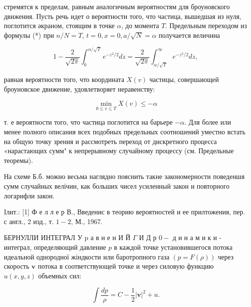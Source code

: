 \documentclass[10pt]{article}
\begin{document}
стремятся к пределам, равным аналогичным вероятностям для броуновского движения. Пусть речь идет о вероятности того, что частица, вышедшая из нуля, поглотится әкраном, стоящим в точке $\alpha$, до момента $T$. Предельным переходом из формулы (*) при $n / N=T$, $t=0, x=0, a / \sqrt{N}=\alpha$ получается величина



\[

1-\frac{2}{\sqrt{2 \pi}} \int_{0}^{\alpha / \sqrt{T}} e^{-z^{2} / 2} d z=\frac{2}{\sqrt{2 \pi}} \int_{\alpha / \sqrt{T}}^{\infty} e^{-z^{2} / 2} d z,

\]



равная вероятности того, что координата $X(v)$ частицы, совершающей броуновское движение, удовлетворяет неравенству:



\[

\min _{0 \leqslant v \leqslant T} X(v) \leqslant-\alpha

\]



т. е вероятности того, что частица поглотится на барьере $-\alpha$. Для более или менее полного описания всех подобных предельных соотношений уместно встать на общую точку зрения и рассмотреть переход от дискретного процесса «нарастающих сумм" к непрерывному случайному процессу (см. Предельные теоремы).



На схеме Б.б. можно весьма наглядно пояснить такне закономерности поведеншя сумм случайных велічин, как больших чисел усиленный закон и повторного логарифли закон.



Iлит.: [1] Ф е л л е р В., Введенис в теорию вероятностей и ее прилтожения, пер. с англ., 2 изд., т. $1-2$, М., 1967.



БЕРНУЛЛИ ИНТЕГРАЛ У $\mathrm{p}$ а в н е н И Й $\Gamma$ И Д р $0-$ д и н а м и к и - интеграл, определяющий давление $p$ в каждой точке установившегося потока идеальной однородної жіндкости или баротропного газа $(p=F(\rho))$ через скорость $\boldsymbol{v}$ потока в соответствующей точке и через силовую функцию $u(x, y, z)$ объемных сил:



\[

\int \frac{d p}{\rho}=C-\frac{1}{2}|\boldsymbol{v}|^{2}+u .

\]
\end{document}
